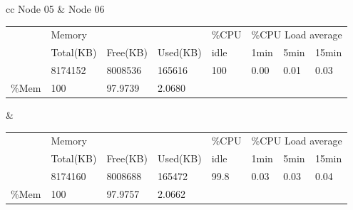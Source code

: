 \documentclass[12pt,a4paper]{report}
\begin{document}
\begin{table}[h!]
\hspace*{-0.9in}
\begin{tabular}{ cc }   %
Node 05 &  Node 06 \\  
\begin{adjustbox}{max width=0.6\textwidth}
\begin{tabular}{l|l|l|l|llll}
\cline{2-8}
\multirow{3}{*}{}           & \multicolumn{3}{l|}{Memory}     & \multicolumn{1}{l|}{\%CPU} & \multicolumn{3}{l|}{\%CPU Load average}                                            \\ \cline{2-8} 
                            & Total(KB) & Free(KB) & Used(KB) & \multicolumn{1}{l|}{idle}  & \multicolumn{1}{l|}{1min} & \multicolumn{1}{l|}{5min} & \multicolumn{1}{l|}{15min} \\ \cline{2-8} 
                            & 8174152   & 8008536  & 165616   & \multicolumn{1}{l|}{100}   & \multicolumn{1}{l|}{0.00} & \multicolumn{1}{l|}{0.01} & \multicolumn{1}{l|}{0.03}  \\ \hline
\multicolumn{1}{|l|}{\%Mem} & 100       & 97.9739  & 2.0680   &                            &                           &                           &                            \\ \cline{1-4}
\end{tabular}
\end{adjustbox} &  %
\begin{adjustbox}{max width=0.6\textwidth}
\begin{tabular}{l|l|l|l|llll}
\cline{2-8}
\multirow{3}{*}{}           & \multicolumn{3}{l|}{Memory}     & \multicolumn{1}{l|}{\%CPU} & \multicolumn{3}{l|}{\%CPU Load average}                                            \\ \cline{2-8} 
                            & Total(KB) & Free(KB) & Used(KB) & \multicolumn{1}{l|}{idle}  & \multicolumn{1}{l|}{1min} & \multicolumn{1}{l|}{5min} & \multicolumn{1}{l|}{15min} \\ \cline{2-8} 
                            & 8174160   & 8008688  & 165472   & \multicolumn{1}{l|}{99.8}  & \multicolumn{1}{l|}{0.03} & \multicolumn{1}{l|}{0.03} & \multicolumn{1}{l|}{0.04}  \\ \hline
\multicolumn{1}{|l|}{\%Mem} & 100       & 97.9757  & 2.0662   &                            &                           &                           &                            \\ \cline{1-4}
\end{tabular}
\end{adjustbox}\\
\end{tabular}
\end{table}
\end{document}
